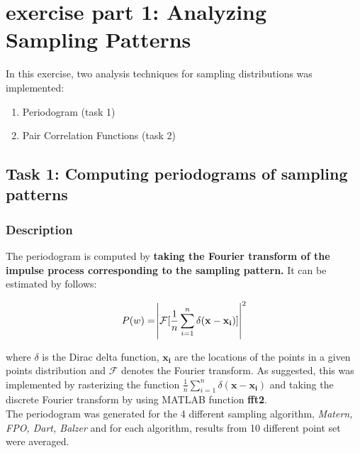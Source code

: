\documentclass[paper=a4, fontsize=11pt]{scrartcl} %
\numberwithin{equation}{section} %
\numberwithin{figure}{section} %
\numberwithin{table}{section} %
\newcommand{\funcname}[1]{\textbf{#1}}
\renewcommand{\vec}[1]{\mathbf{#1}}
\begin{document}
\section{exercise part 1: Analyzing Sampling Patterns}

In this exercise, two analysis techniques for sampling distributions was implemented:

\begin{enumerate}
	\item Periodogram (task 1)
	\item Pair Correlation Functions (task 2)
\end{enumerate}

\subsection{Task 1: Computing periodograms of sampling patterns}

\subsubsection{Description}

The periodogram is computed by \textbf{taking the Fourier transform of the impulse process corresponding to the sampling pattern.} It can be estimated by follows:

\begin{equation}
	P(w) = \abs{ \mathcal{F} [\frac{1}{n} \sum_{i=1}^{n} \delta(\vec{x} - \vec{x_i})]}^2
\end{equation}

where $\delta$ is the Dirac delta function, $\vec{x_i}$ are the locations of the points in a given points distribution and $\mathcal{F}$ denotes the Fourier transform. As suggested, this was implemented by rasterizing the function $\frac{1}{n} \sum_{i=1}^{n} \delta(\vec{x} - \vec{x_i})$ and taking the discrete Fourier transform by using MATLAB function \funcname{fft2}. 
\\

The periodogram was generated for the 4 different sampling algorithm, \textit{Matern, FPO, Dart, Balzer} and for each algorithm, results from 10 different point set were averaged.  

\end{document}
